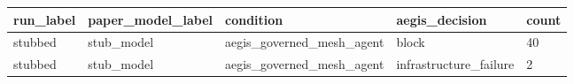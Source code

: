 \begin{tabular}{lllll}
 \hline
run\_label & paper\_model\_label & condition & aegis\_decision & count \\
 \hline
stubbed & stub\_model & aegis\_governed\_mesh\_agent & block & 40 \\
stubbed & stub\_model & aegis\_governed\_mesh\_agent & infrastructure\_failure & 2 \\
 \hline
\end{tabular}
